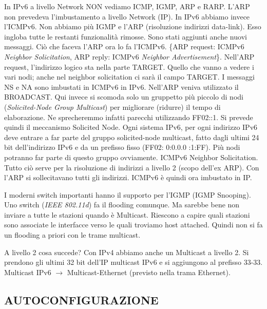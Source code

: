 In IPv6 a livello Network NON vediamo ICMP, IGMP, ARP e RARP. L'ARP non prevedeva l'imbustamento a livello Network (IP). In IPv6 abbiamo invece l'ICMPv6. Non abbiamo più IGMP e l'ARP (risoluzione indirizzi data-link). Esso ingloba tutte le restanti funzionalità rimosse. Sono stati aggiunti anche nuovi messaggi. Ciò che faceva l'ARP ora lo fa l'ICMPv6. \{ARP request: ICMPv6 \textit{Neighbor Solicitation}, ARP reply: ICMPv6 \textit{Neighbor Advertisement}\}. Nell'ARP request, l'indirizzo logico sta nella parte TARGET. Quello che vanno a vedere i vari nodi; anche nel neighbor solicitation ci sarà il campo TARGET. I messaggi NS e NA sono imbustati in ICMPv6 in IPv6. Nell'ARP veniva utilizzato il BROADCAST. Qui invece si scomoda solo un gruppetto più piccolo di nodi (\textit{Solicited-Node Group Multicast}) per migliorare (ridurre) il tempo di elaborazione. Ne sprecheremmo infatti parecchi utilizzando FF02::1. Si prevede quindi il meccanismo Solicited Node. Ogni sistema IPv6, per ogni indirizzo IPv6 deve entrare a far parte del gruppo solicited-node multicast, fatto dagli ultimi 24 bit dell'indirizzo IPv6 e da un prefisso fisso (FF02: 0:0.0.0 :1:FF). Più nodi potranno far parte di questo gruppo ovviamente. ICMPv6 Neighbor Solicitation. Tutto ciò serve per la risoluzione di indirizzi a livello 2 (scopo dell'ex ARP). Con l'ARP si sollecitavano tutti gli indirizzi. ICMPv6 è quindi ora imbustato in IP.

I moderni switch importanti hanno il supporto per l'IGMP (IGMP Snooping). Uno switch (\textit{IEEE 802.11d}) fa il flooding comunque. Ma sarebbe bene non inviare a tutte le stazioni quando è Multicast. Riescono a capire quali stazioni sono associate le interfacce verso le quali troviamo host attached. Quindi non si fa un flooding a priori con le trame multicast.

A livello 2 cosa succede? Con IPv4 abbiamo anche un Multicast a livello 2. Si prendono gli ultimi 32 bit dell'IP multicast IPv6 e si aggiungono al prefisso 33-33. Multicast IPv6 $\rightarrow$ Multicast-Ethernet (previsto nella trama Ethernet).

\subsection{AUTOCONFIGURAZIONE}

